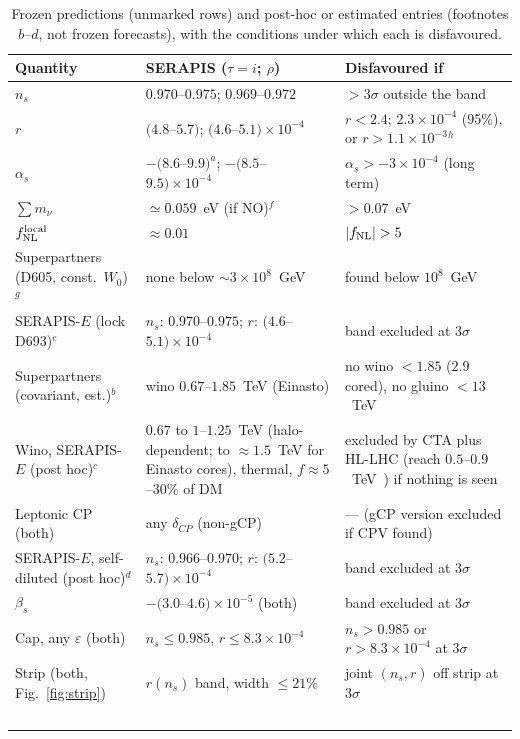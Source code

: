 \documentclass[aps,prd,twocolumn,superscriptaddress,nofootinbib,floatfix]{revtex4-2}
\begin{document}
\begin{table}[tbp]
\caption{Frozen predictions (unmarked rows) and post-hoc or estimated entries (footnotes $b$--$d$, not frozen forecasts), with the conditions under which each is disfavoured.}\label{tab:forward}
\begin{ruledtabular}
\begin{tabular}{lll}
Quantity & SERAPIS ($\tau=i$; $\rho$) & Disfavoured if \\
\hline
$n_s$ & $0.970$--$0.975$; $0.969$--$0.972$ & $>3\sigma$ outside the band \\
$r$ & $(4.8$--$5.7)$; $(4.6$--$5.1)\times10^{-4}$ & $r<2.4$; $2.3\times10^{-4}$ (95\%), or $r>1.1\times10^{-3}$$^h$ \\
$\alpha_s$ & $-(8.6$--$9.9)^a$; $-(8.5$--$9.5)\times10^{-4}$ & $\alpha_s>-3\times10^{-4}$ (long term) \\
$\sum m_\nu$ & $\simeq0.059$~eV (if NO)$^f$ & $>0.07$~eV \\
$f_{\rm NL}^{\rm local}$ & $\approx 0.01$ & $|f_{\rm NL}|>5$ \\
Superpartners (D605, const.\ $W_0$)$^g$ & none below $\sim3\times10^8$~GeV & found below $10^8$~GeV \\
SERAPIS-$E$ (lock D693)$^e$ & $n_s$: $0.970$--$0.975$; $r$: $(4.6$--$5.1)\times10^{-4}$ & band excluded at $3\sigma$ \\
Superpartners (covariant, est.)$^b$ & wino $0.67$--$1.85$~TeV (Einasto) & no wino $<1.85$ ($2.9$ cored), no gluino $<13$~TeV \\
Wino, SERAPIS-$E$ (post hoc)$^c$ & $0.67$ to $1$--$1.25$~TeV (halo-dependent; to $\approx1.5$~TeV for Einasto cores), thermal, $f\approx5$--$30\%$ of DM & excluded by CTA plus HL-LHC (reach $0.5$--$0.9$~TeV~\cite{arXiv_1805_00015}) if nothing is seen \\
Leptonic CP (both) & any $\delta_{CP}$ (non-gCP) & --- (gCP version excluded if CPV found) \\
SERAPIS-$E$, self-diluted (post hoc)$^d$ & $n_s$: $0.966$--$0.970$; $r$: $(5.2$--$5.7)\times10^{-4}$ & band excluded at $3\sigma$ \\
$\beta_s$ & $-(3.0$--$4.6)\times10^{-5}$ (both) & band excluded at $3\sigma$ \\
Cap, any $\varepsilon$ (both) & $n_s\le0.985$, $r\le8.3\times10^{-4}$ & $n_s>0.985$ or $r>8.3\times10^{-4}$ at $3\sigma$ \\
Strip (both, Fig.~\ref{fig:strip}) & $r(n_s)$ band, width $\le21\%$ & joint $(n_s,r)$ off strip at $3\sigma$ \\
$$
\end{tabular}
\end{ruledtabular}
\end{table}
\end{document}
